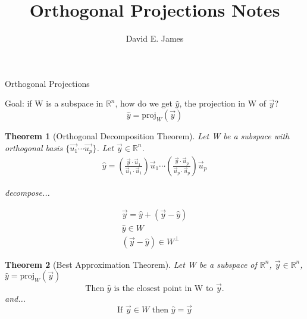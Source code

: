 \documentclass{article}
\title{Orthogonal Projections Notes}
\author{David E. James}
\theoremstyle{break}
\newtheorem*{theorem}{Theorem}
\begin{document}
\maketitle
Orthogonal Projections

\bigskip


\bigskip

Goal: if W is a subspace in $\mathbb{R}^n$, how do we get $\hat{y}$, the
projection in W of $\vec{y}$?
\begin{equation}
    \hat{y} = \text{proj}_W(\vec{y})
\end{equation}

\bigskip

\begin{theorem}[Orthogonal Decomposition Theorem]
Let W be a subspace with orthogonal basis $\{\vec{u_1} \dotsm \vec{u_p}\}$.
Let $\vec{y} \in \mathbb{R}^n$.
\begin{align}
    \hat{y} = \left(\frac{\vec{y} \cdot \vec{u}_1}{\vec{u}_1 \cdot \vec{u}_1}\right)\vec{u}_1 \dotsm \left(\frac{\vec{y} \cdot \vec{u}_p}{\vec{u}_p \cdot \vec{u}_p}\right)\vec{u}_p
\end{align}

decompose...

\begin{align}
    \vec{y} = \hat{y} + \left( \vec{y} - \hat{y} \right) \\
    \hat{y} \in W \\
    \left( \vec{y} - \hat{y} \right) \in W^{\perp}
\end{align}

\end{theorem}




\begin{theorem}[Best Approximation Theorem]
    Let W be a subspace of $\mathbb{R}^n$, $\vec{y} \in \mathbb{R}^n$, $\hat{y} = \text{proj}_W(\vec{y})$
    \bigskip
    \begin{equation}
        \text{Then } \hat{y} \text{ is the closest point in W to }\vec{y}.
    \end{equation}
    and...
    \begin{equation}
        \text{If } \vec{y} \in W \text{ then } \hat{y} = \vec{y}
    \end{equation}


\end{theorem}
\end{document}
